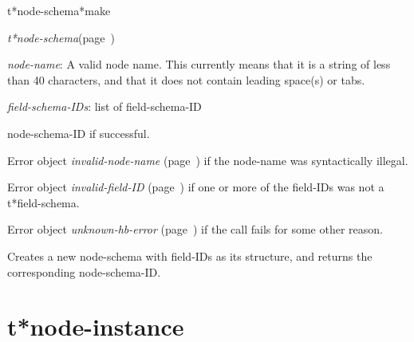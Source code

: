 \begin{description}
\item [Name:]  t*node-schema*make

\item [Class:] {\sl t*node-schema}\hfill(page~\pageref{t*node-schema})

\item [Parameters:]
\item {\sl node-name}:  
A valid node name. This currently means that it is a
string of less than 40 characters, and that it does
not contain leading space(s) or tabs.

\item {\sl field-schema-IDs}:  list of field-schema-ID


\item [Return-value:] 
node-schema-ID if successful.

Error object {\sl invalid-node-name} (page~\pageref{invalid-node-name}) if the node-name
was syntactically illegal.

Error object {\sl invalid-field-ID} (page~\pageref{invalid-field-ID}) if one or more of the
field-IDs was not a t*field-schema.

Error object {\sl unknown-hb-error} (page~\pageref{unknown-hb-error}) if the call fails
for some other reason.
 
\item [Description:]

Creates a new node-schema with field-IDs as its
structure, and returns the corresponding node-schema-ID.

\item [Public:]



\end{description}
\horizontalline

\section{t*node-instance}
\label{t*node-instance}

